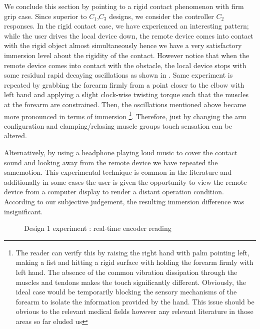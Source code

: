 We conclude this section by pointing to a rigid contact phenomenon with firm grip case. Since superior to $C_1$,$C_3$ designs, we 
consider the controller $C_2$ responses. In the rigid contact case, we have experienced an interesting pattern; while the user drives the 
local device down, the remote device comes into contact with the rigid object almost simultaneously hence we have a very satisfactory 
immersion level about the rigidity of the contact. However notice that when the remote device comes into contact with the obstacle, the 
local device stops with some residual rapid decaying oscillations as shown in . Same experiment is 
repeated by grabbing the forearm firmly from a point closer to the elbow with left hand and applying a slight clock-wise twisting torque 
such that the muscles at the forearm are constrained. Then, the oscillations mentioned above became more pronounced in terms of immersion
\footnote{The reader can verify this by raising the right hand with palm pointing left, making a fist and hitting a rigid surface with 
holding the forearm firmly with left hand. The absence of the common vibration dissipation through the muscles and tendons makes the 
touch significantly different. Obviously, the ideal case would be temporarily blocking the sensory mechanisms of the forearm to isolate 
the information provided by the hand. This issue should be obvious to the relevant medical fields however any relevant literature in 
those areas so far eluded us}. Therefore, just by changing the arm configuration and clamping/relasing muscle groups touch sensation can 
be altered. 

Alternatively, by using a headphone playing loud music to cover the contact sound and looking away from the remote device we have 
repeated the samemotion. This experimental technique is common in the literature and additionally in some cases the user is given the 
opportunity to view the remote device from a computer display to render a distant operation condition. According to our subjective 
judgement, the resulting immersion difference was insignificant. 


\newpage

\begin{figure}%
\centering
{}
\caption{Design 1 experiment : real-time encoder reading}%
\label{fig:app:design1overall}%
\end{figure}


